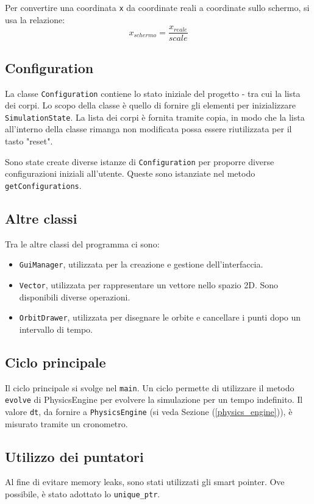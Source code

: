 \documentclass{article}
\begin{document}
Per convertire una coordinata \verb|x| da coordinate reali a coordinate sullo schermo, si usa la relazione:
\begin{equation*}
    x_{schermo} = \frac{x_{reale}}{scale}
\end{equation*}

\subsection{Configuration}
La classe \verb|Configuration| contiene lo stato iniziale del progetto - tra cui la lista dei corpi. Lo scopo della classe è quello di fornire gli elementi per inizializzare \verb|SimulationState|. La lista dei corpi è fornita tramite copia, in modo che la lista all'interno della classe rimanga non modificata possa essere riutilizzata per il tasto "reset".

Sono state create diverse istanze di \verb|Configuration| per proporre diverse configurazioni iniziali all'utente. Queste sono istanziate nel metodo \verb|getConfigurations|.

\subsection{Altre classi}
Tra le altre classi del programma ci sono:
\begin{itemize}
    \item \verb|GuiManager|, utilizzata per la creazione e gestione dell'interfaccia.
    \item \verb|Vector|, utilizzata per rappresentare un vettore nello spazio 2D. Sono disponibili diverse operazioni.
    \item \verb|OrbitDrawer|, utilizzata per disegnare le orbite e cancellare i punti dopo un intervallo di tempo.
\end{itemize}

\subsection{Ciclo principale}
Il ciclo principale si svolge nel \verb|main|. Un ciclo permette di utilizzare il metodo \verb|evolve| di PhysicsEngine per evolvere la simulazione per un tempo indefinito. Il valore \verb|dt|, da fornire a \verb|PhysicsEngine| (si veda Sezione (\ref{physics_engine})), è misurato tramite un cronometro.

\subsection{Utilizzo dei puntatori}
Al fine di evitare memory leaks, sono stati utilizzati gli smart pointer. Ove possibile, è stato adottato lo \verb|unique_ptr|.
\end{document}

